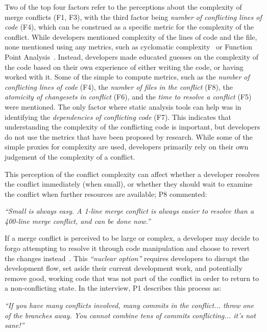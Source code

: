 \label{artifact-based-factors}
Two of the top four factors refer to the perceptions about the complexity of merge conflicts (F1, F3), with the third factor being \textit{number of conflicting lines of code} (F4), which can be construed as a specific metric for the complexity of the conflict. 
While developers mentioned complexity of the lines of code and the file, none mentioned using any metrics, such as cyclomatic complexity~\cite{fenton2000quantitative,mccabe1976complexity} or Function Point Analysis~\cite{garmus2001fpa,symons1988function}. 
Instead, developers made educated guesses on the complexity of the code based on their own experience of either writing the code, or having worked with it. 
Some of the simple to compute metrics, such as the \textit{number of conflicting lines of code} (F4), the \textit{number of files in the conflict} (F8), the \textit{atomicity of changesets in conflict} (F6), and the \textit{time to resolve a conflict} (F5) were mentioned. 
The only factor where static analysis tools can help was in identifying the \textit{dependencies of conflicting code} (F7).
This indicates that understanding the complexity of the conflicting code is important, but developers do not use the metrics that have been proposed by research.
While some of the simple proxies for complexity are used, developers primarily rely on their own judgement of the complexity of a conflict.

This perception of the conflict complexity can affect whether a developer resolves the conflict immediately (when small), or whether they should wait to examine the conflict when further resources are available; P8 commented:
\begin{quoting}
\textit{``Small is always easy. A 1-line merge conflict is always easier to resolve than a 400-line merge conflict, and can be done now.''}
\end{quoting}

If a merge conflict is perceived to be large or complex, a developer may decide to forgo attempting to resolve it through code manipulation and choose to revert the changes instead~\cite{Guzzi2015}.
This \emph{``nuclear option''} requires developers to disrupt the development flow, set aside their current development work, and potentially remove good, working code that was not part of the conflict in order to return to a non-conflicting state.
In the interview, P1 describes this process as:
\begin{quoting}
\textit{``If you have many conflicts involved, many commits in the conflict... throw one of the branches away. You cannot combine tens of commits conflicting... it's not sane!''}
\end{quoting}

